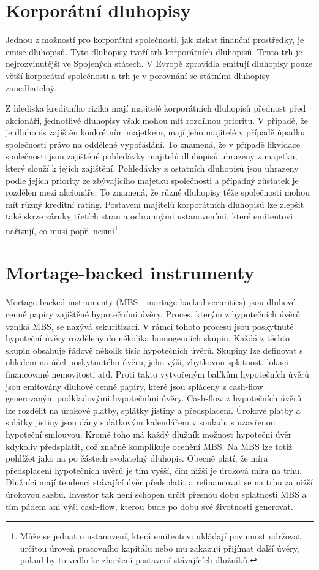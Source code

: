 \documentclass[a4paper]{book}
\begin{document}
\section{Korporátní dluhopisy}

Jednou z možností pro korporátní společnosti, jak získat finanční prostředky, je emise dluhopisů. Tyto dluhopisy tvoří trh korporátních dluhopisů. Tento trh je nejrozvinutější ve Spojených státech. V Evropě zpravidla emitují dluhopisy pouze větší korporátní společnosti a trh je v porovnání se státními dluhopisy zanedbatelný.

Z hlediska kreditního rizika mají majitelé korporátních dluhopisů přednost před akcionáři, jednotlivé dluhopisy však mohou mít rozdílnou prioritu. V případě, že je dluhopis zajištěn konkrétním majetkem, mají jeho majitelé v případě úpadku společnosti právo na oddělené vypořádání. To znamená, že v případě likvidace společnosti jsou zajištěné pohledávky majitelů dluhopisů uhrazeny z majetku, který slouží k jejich zajištění. Pohledávky z ostatních dluhopisů jsou uhrazeny podle jejich priority ze zbývajícího majetku společnosti a případný zůstatek je rozdělen mezi akcionáře. To znamená, že různé dluhopisy téže společnosti mohou mít různý kreditní rating. Postavení majitelů korporátních dluhopisů lze zlepšit také skrze záruky třetích stran a ochrannými ustanoveními, které emitentovi nařizují, co musí popř. nesmí\footnote{Může se jednat o ustanovení, která emitentovi ukládají povinnost udržovat určitou úroveň pracovního kapitálu nebo mu zakazují přijímat další úvěry, pokud by to vedlo ke zhoršení postavení stávajících dlužníků.}.

\section{Mortage-backed instrumenty}

Mortage-backed instrumenty (MBS - mortage-backed securities) jsou dluhové cenné papíry zajištěné hypotečními úvěry. Proces, kterým z hypotečních úvěrů vzniká MBS, se nazývá sekuritizací. V rámci tohoto procesu jsou poskytnuté hypoteční úvěry rozděleny do několika homogenních skupin. Každá z těchto skupin obsahuje řádově několik tisíc hypotečních úvěrů. Skupiny lze definovat s ohledem na účel poskytnutého úvěru, jeho výši, zbytkovou splatnost, lokaci financované nemovitosti atd. Proti takto vytvořeným balíkům hypotečních úvěrů jsou emitovány dluhové cenné papíry, které jsou spláceny z cash-flow generovaným podkladovými hypotečními úvěry. Cash-flow z hypotečních úvěrů lze rozdělit na úrokové platby, splátky jistiny a předsplacení. Úrokové platby a splátky jistiny jsou dány splátkovým kalendářem v souladu s uzavřenou hypoteční smlouvou. Kromě toho má každý dlužník možnost hypoteční úvěr kdykoliv předsplatit, což značně komplikuje ocenění MBS. Na MBS lze totiž pohlížet jako na po částech svolatelný dluhopis. Obecně platí, že míra předsplacení hypotečních úvěrů je tím vyšší, čím nižší je úroková míra na trhu. Dlužníci mají tendenci stávající úvěr předsplatit a refinancovat se na trhu za nižší úrokovou sazbu. Investor tak není schopen určit přesnou dobu splatnosti MBS a tím pádem ani výši cash-flow, kterou bude po dobu své životnosti generovat.
\end{document}
